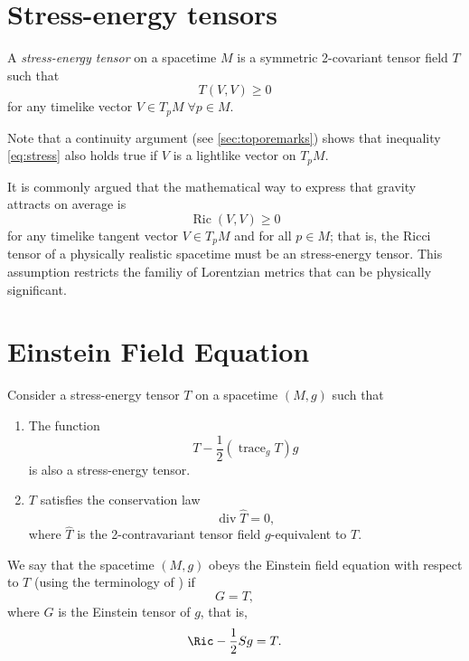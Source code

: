 \section{Stress-energy tensors}
\label{sec:stressenergy}

\begin{definition}
	A \emph{stress-energy tensor} on a spacetime $M$ is a symmetric 2-covariant tensor field $T$ such that
	\begin{equation}
	\label{eq:stress}
		T(V,V) \geq 0
	\end{equation}
	for any timelike vector $V \in T_p M \; \forall p \in M$.
\end{definition}

Note that a continuity argument (see \autoref{sec:toporemarks}) shows that inequality \ref{eq:stress} also holds true if $V$ is a lightlike vector on $T_p M$.

It is commonly argued that the mathematical way to express that gravity attracts on average is
\begin{equation}
	\operatorname{Ric} (V,V) \geq 0
\end{equation}
for any timelike tangent vector $V \in T_p M$ and for all $p \in M$; that is, the Ricci tensor of a physically realistic spacetime must be an stress-energy tensor. This assumption restricts the familiy of Lorentzian metrics that can be physically significant.

\section{Einstein Field Equation}

Consider a stress-energy tensor $T$ on a spacetime $(M,g)$ such that
\begin{enumerate}
	\item The function \begin{equation}
		\label{eq:stressderived}
		T - \frac{1}{2}(\operatorname{trace}_g T) g
	\end{equation} is also a stress-energy tensor.
	\item $T$ satisfies the conservation law \begin{equation}
		\label{eq:div0}
		\operatorname{div} \widehat{T} = 0,
	\end{equation}
	where $\widehat{T}$ is the 2-contravariant tensor field $g$-equivalent to $T$.
\end{enumerate}

We say that the spacetime $(M,g)$ obeys the Einstein field equation with respect to $T$ (using the terminology of \cite[Sec. 6.2]{sachswu77}) if
\begin{equation}
	\label{eq:einstein}
	G  = T,
\end{equation}
where $G$ is the Einstein tensor of $g$, that is,
\begin{equation}
	\label{eq:einstein2}
	\Ric - \frac{1}{2}Sg = T.
\end{equation}

